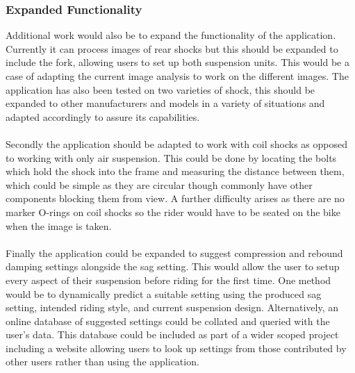 		\subsubsection{Expanded Functionality}
			Additional work would also be to expand the functionality of the application. Currently it can process images of rear shocks but this should be expanded to include the fork, allowing users to set up both suspension units. This would be a case of adapting the current image analysis to work on the different images. The application has also been tested on two varieties of shock, this should be expanded to other manufacturers and models in a variety of situations and adapted accordingly to assure its capabilities.
			\\\\
			Secondly the application should be adapted to work with coil shocks as opposed to working with only air suspension. This could be done by locating the bolts which hold the shock into the frame and measuring the distance between them, which could be simple as they are circular though commonly have other components blocking them from view. A further difficulty arises as there are no marker O-rings on coil shocks so the rider would have to be seated on the bike when the image is taken.
			\\\\
			Finally the application could be expanded to suggest compression and rebound damping settings alongside the sag setting. This would allow the user to setup every aspect of their suspension before riding for the first time. One method would be to dynamically predict a suitable setting using the produced sag setting, intended riding style, and current suspension design. Alternatively, an online database of suggested settings could be collated and queried with the user's data. This database could be included as part of a wider scoped project including a website allowing users to look up settings from those contributed by other users rather than using the application.
